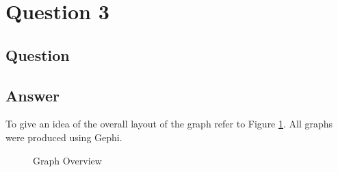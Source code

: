 \section{Question 3}

\subsection{Question}


\subsection{Answer}
To give an idea of the overall layout of the graph refer to Figure \ref{fig:overview}. All graphs were produced using Gephi\cite{graph:gephi}.

\begin{figure}[h!]
\centering
{}
\caption{Graph Overview}
\label{fig:overview}
\end{figure}

